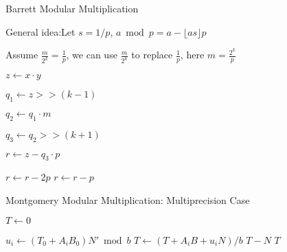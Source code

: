 \documentclass{beamer}
\begin{document}
\begin{frame}{Barrett Modular Multiplication}


General idea:Let $s = 1/p$, $a \bmod p = a - \lfloor as \rfloor p$

Assume $\frac{m}{2^k} = \frac{1}{p}$, we can use $\frac{m}{2^k}$ to replace $\frac{1}{p}$, here $m = \frac{2^k}{p}$
	\begin{algorithmic}
	
		\STATE $z \leftarrow x \cdot y$
	
		\STATE $q_1 \leftarrow z >> (k-1)$
	
		\STATE $q_2 \leftarrow q_1 \cdot m$
	
		\STATE $q_3 \leftarrow q_2 >> (k+1)$
	
		\STATE $r \leftarrow z - q_3 \cdot p$
	
			\STATE $r \leftarrow r - 2p$ 
			\STATE$r \leftarrow r - p$
		\ENDIF
\end{algorithmic}
\end{frame}

% 
\begin{frame}{Montgomery Modular Multiplication: Multiprecision Case}
	\begin{algorithmic}

		\STATE $T \gets 0$

		\STATE $u_i \gets (T_0 + A_iB_0)N' \bmod b$
		\STATE $T \gets (T+A_iB+u_iN)/b$
		\ENDFOR
		\RETURN $T-N$
		\ELSE
		\RETURN $T$
		\ENDIF
	\end{algorithmic}
\end{frame}
\end{document}

